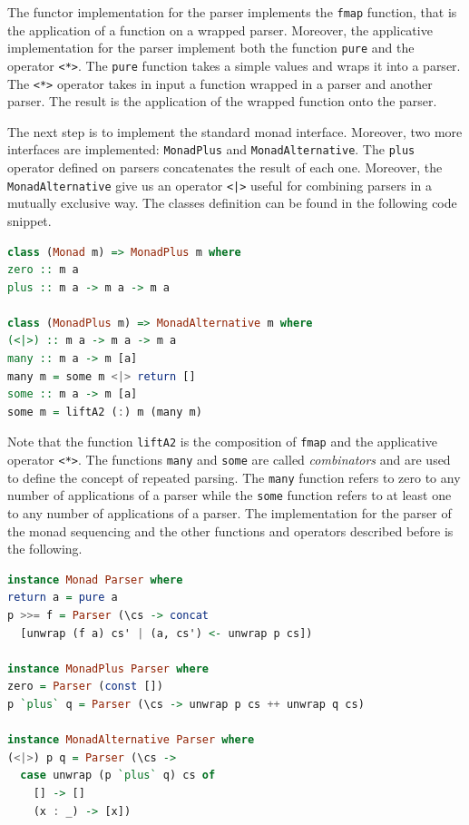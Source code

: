 \documentclass[12pt,a4paper]{article}
\begin{document}
The functor implementation for the parser implements the \texttt{fmap} function, that is the application of a function on a wrapped parser.
Moreover, the applicative implementation for the parser implement both the function \texttt{pure} and the operator \texttt{<*>}.
The \texttt{pure} function takes a simple values and wraps it into a parser.
The \texttt{<*>} operator takes in input a function wrapped in a parser and another parser.
The result is the application of the wrapped function onto the parser.

The next step is to implement the standard monad interface.
Moreover, two more interfaces are implemented: \texttt{MonadPlus} and \texttt{MonadAlternative}.
The \texttt{plus} operator defined on parsers concatenates the result of each one.
Moreover, the \texttt{MonadAlternative} give us an operator \texttt{<|>} useful for combining parsers in a mutually exclusive way.
The classes definition can be found in the following code snippet.
\begin{lstlisting}[language=Haskell, style=custom-style]
class (Monad m) => MonadPlus m where
zero :: m a
plus :: m a -> m a -> m a

class (MonadPlus m) => MonadAlternative m where
(<|>) :: m a -> m a -> m a
many :: m a -> m [a]
many m = some m <|> return []
some :: m a -> m [a]
some m = liftA2 (:) m (many m)
\end{lstlisting}
Note that the function \texttt{liftA2} is the composition of \texttt{fmap} and the applicative operator \texttt{<*>}.
The functions \texttt{many} and \texttt{some} are called \textit{combinators} and are used to define the concept of repeated parsing.
The \texttt{many} function refers to zero to any number of applications of a parser while the \texttt{some} function refers to at least one to any number of applications of a parser.
The implementation for the parser of the monad sequencing and the other functions and operators described before is the following.
\begin{lstlisting}[language=Haskell, style=custom-style]
instance Monad Parser where
return a = pure a
p >>= f = Parser (\cs -> concat
  [unwrap (f a) cs' | (a, cs') <- unwrap p cs])

instance MonadPlus Parser where
zero = Parser (const [])
p `plus` q = Parser (\cs -> unwrap p cs ++ unwrap q cs)

instance MonadAlternative Parser where
(<|>) p q = Parser (\cs ->
  case unwrap (p `plus` q) cs of
    [] -> []
    (x : _) -> [x])
\end{lstlisting}
\end{document}
